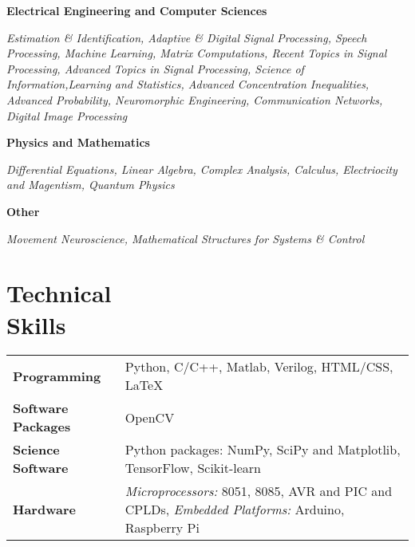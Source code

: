 \documentclass[margin,line]{res}
\newenvironment{list1}{
  \begin{list}{\ding{113}}{%
      \setlength{\itemsep}{0in}
      \setlength{\parsep}{0in} \setlength{\parskip}{0in}
      \setlength{\topsep}{0in} \setlength{\partopsep}{0in} 
      \setlength{\leftmargin}{0.17in}}}{\end{list}}
\begin{document}
\begin{resume}
\begin{list1}
\item[\strut\hspace{0.5cm}\hypertarget{crselst}{\textbf{Electrical Engineering and Computer Sciences}}]
\item[]\textit{Estimation \& Identification, Adaptive \& Digital Signal Processing, Speech Processing, Machine Learning, Matrix Computations, Recent Topics in Signal Processing, Advanced Topics in Signal Processing, Science of Information,Learning and Statistics, Advanced Concentration Inequalities, Advanced Probability, Neuromorphic Engineering, Communication Networks, Digital Image Processing}
\vspace{0.05in}
\item[\strut\hspace{0.5cm}\textbf{Physics and Mathematics}]
\vspace{0.05in}
\item[]\textit{Differential Equations, Linear Algebra, Complex Analysis, Calculus, Electriocity and Magentism, Quantum Physics}
\item[\strut\hspace{0.5cm}\textbf{Other}]
\vspace{0.05in}
\item[]\textit{Movement Neuroscience, Mathematical Structures for Systems \& Control}

\end{list1}

\section{\sc Technical \\Skills} 
\begin{tabular}{@{}p{1.3in}p{4.3in}}
\textbf{Programming} & Python, C/C++, Matlab, Verilog, HTML/CSS, \LaTeX \\  
\vspace*{-0.06in}
\textbf{Software Packages} & 
\vspace*{-0.06in} OpenCV \\ 
\vspace*{-0.06in}
\textbf{Science Software} &
\vspace*{-0.06in}
Python packages: NumPy, SciPy and Matplotlib, TensorFlow, Scikit-learn \\
\vspace*{-0.06in}
\textbf{Hardware} &
\vspace*{-0.06in}
\textit{Microprocessors:} 8051, 8085, AVR and PIC and CPLDs, \textit{Embedded Platforms:} Arduino, Raspberry Pi \\     
\end{tabular}


\end{resume}
\end{document}
